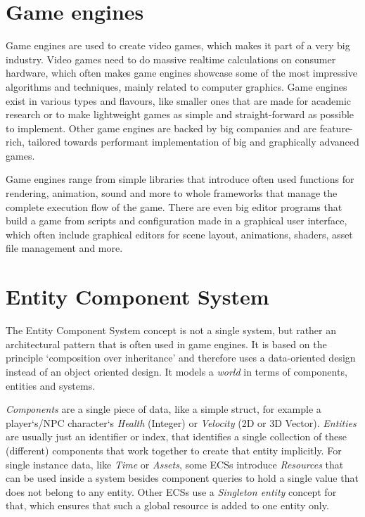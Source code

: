 \label{chap:introduction}

\section*{Game engines}

Game engines are used to create video games, which makes it part of a very big industry. Video games need to do massive realtime calculations on consumer hardware, which often makes game engines showcase some of the most impressive algorithms and techniques, mainly related to computer graphics. Game engines exist in various types and flavours, like smaller ones that are made for academic research or to make lightweight games as simple and straight-forward as possible to implement. Other game engines are backed by big companies and are feature-rich, tailored towards performant implementation of big and graphically advanced games.

Game engines range from simple libraries that introduce often used functions for rendering, animation, sound and more to whole frameworks that manage the complete execution flow of the game. There are even big editor programs that build a game from scripts and configuration made in a graphical user interface, which often include graphical editors for scene layout, animations, shaders, asset file management and more.

\section*{Entity Component System}

The Entity Component System concept is not a single system, but rather an architectural pattern that is often used in game engines. It is based on the principle `composition over inheritance' and therefore uses a data-oriented design instead of an object oriented design. It models a \textit{world} in terms of components, entities and systems.

\textit{Components} are a single piece of data, like a simple struct, for example a player`s/NPC character`s \textit{Health} (Integer) or \textit{Velocity} (2D or 3D Vector). \textit{Entities} are usually just an identifier or index, that identifies a single collection of these (different) components that work together to create that entity implicitly. For single instance data, like \textit{Time} or \textit{Assets}, some ECSs introduce \textit{Resources} that can be used inside a system besides component queries to hold a single value that does not belong to any entity. Other ECSs use a \textit{Singleton entity} concept for that, which ensures that such a global resource is added to one entity only.

